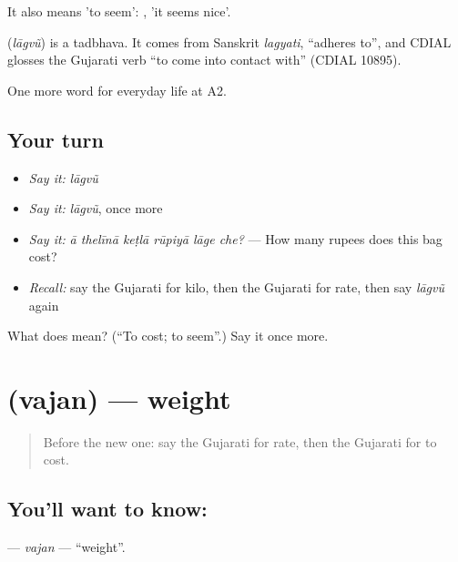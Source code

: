 It also means 'to seem': \textbf{  }, 'it seems nice'.

\begin{cousinweb}
\textbf{} (\emph{lāgvũ}) is a tadbhava. It comes from Sanskrit \emph{lagyati}, \textquotedblleft{}adheres to\textquotedblright{}, and CDIAL glosses the Gujarati verb \textquotedblleft{}to come into contact with\textquotedblright{} (CDIAL 10895).
\end{cousinweb}

\begin{grammarlens}[title={What you've built}]
One more word for everyday life at A2.
\end{grammarlens}

\subsection*{Your turn}
\begin{itemize}
\raggedright
  \item \emph{Say it:} \emph{lāgvũ}
  \item \emph{Say it:} \emph{lāgvũ}, once more
  \item \emph{Say it:} \emph{ā thelīnā keṭlā rūpiyā lāge che?} — How many rupees does this bag cost?
  \item \emph{Recall:} say the Gujarati for kilo, then the Gujarati for rate, then say \emph{lāgvũ} again
\end{itemize}

\begin{tcolorbox}[breakable,colback=teal!4,colframe=teal!35!black,title={Before you move on}]
What does  mean? (\textquotedblleft{}To cost; to seem\textquotedblright{}.) Say it once more.
\end{tcolorbox}
\section[\texorpdfstring{\gu{વજન} (vajan)}{વજન (vajan)}]{ (vajan) — weight}

\label{lesson:GU-C184-vajan}



\begin{quote}
Before the new one: say the Gujarati for rate, then the Gujarati for to cost.
\end{quote}

\subsection*{You'll want to know: }
\textbf{} — \emph{vajan} — \textquotedblleft{}weight\textquotedblright{}.

